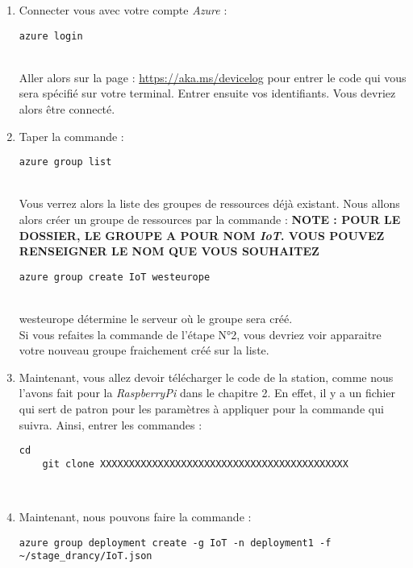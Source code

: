 \begin{enumerate}
	\item Connecter vous avec votre compte \textit{Azure} :
	\begin{lstlisting}[style=MyBashStyle]
	azure login
	\end{lstlisting}\\
	Aller alors sur la page : \href{https://aka.ms/devicelog}{https://aka.ms/devicelog} pour entrer le code qui vous sera spécifié sur votre terminal. Entrer ensuite vos identifiants. Vous devriez alors être connecté. %
	\item Taper la commande :
	\begin{lstlisting}[style=MyBashStyle]
	azure group list
	\end{lstlisting}\\
Vous verrez alors la liste des groupes de ressources déjà existant. Nous allons alors créer un groupe de ressources par la commande : 
	\textbf{NOTE : POUR LE DOSSIER, LE GROUPE A POUR NOM \textit{IoT}. VOUS POUVEZ RENSEIGNER LE NOM QUE VOUS SOUHAITEZ}\\
	\begin{lstlisting}[style=MyBashStyle]
	azure group create IoT westeurope
	\end{lstlisting}\\
westeurope détermine le serveur où le groupe sera créé. %
\\
Si vous refaites la commande de l'étape N°2, vous devriez voir apparaitre votre nouveau groupe fraichement créé sur la liste.
	\item Maintenant, vous allez devoir télécharger le code de la station, comme nous l'avons fait pour la \textit{RaspberryPi} dans le chapitre 2. En effet, il y a un fichier qui sert de patron pour les paramètres à appliquer pour la commande qui suivra. Ainsi, entrer les commandes : 
	\begin{lstlisting}[style=MyBashStyle]
	cd
	git clone XXXXXXXXXXXXXXXXXXXXXXXXXXXXXXXXXXXXXXXXXXX
	\end{lstlisting}\\
	\item Maintenant, nous pouvons faire la commande :
	\begin{lstlisting}[style=MyBashStyle]
	azure group deployment create -g IoT -n deployment1 -f ~/stage_drancy/IoT.json
	\end{lstlisting}\\ %


\end{enumerate}
